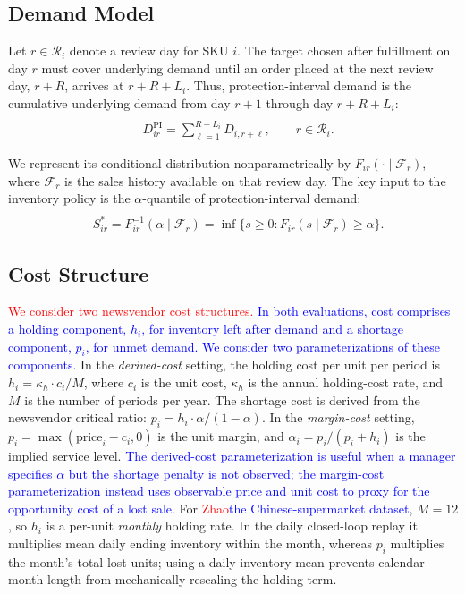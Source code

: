 \documentclass[msom,dblanonrev]{informs4}
\newcommand{\cF}{\mathcal{F}}
\newcommand{\add}[1]{\textcolor{blue}{#1}}
\newcommand{\reduce}[1]{\textcolor{red}{#1}\hspace{0.5em}}
\begin{document}
\subsection{Demand Model}

Let $r\in\mathcal R_i$ denote a review day for SKU $i$. The target chosen after fulfillment on day $r$ must cover underlying demand until an order placed at the next review day, $r+R$, arrives at $r+R+L_i$. Thus, protection-interval demand is the cumulative underlying demand from day $r+1$ through day $r+R+L_i$:
\begin{equation}\label{eq:pi_demand}
  \begin{aligned}
    &\\
    &D_{ir}^{\text{PI}} = \sum_{\ell=1}^{R+L_i} D_{i,r+\ell}, \qquad r\in\mathcal R_i.
  \end{aligned}
\end{equation}


We represent its conditional distribution nonparametrically by $F_{ir}(\cdot \mid \cF_r)$, where $\cF_r$ is the sales history available on that review day.
The key input to the inventory policy is the $\alpha$-quantile of protection-interval demand:
\begin{equation}\label{eq:quantile}
  \begin{aligned}
    &\\
    &S_{ir}^* = F_{ir}^{-1}(\alpha \mid \cF_r) = \inf\{s \geq 0 : F_{ir}(s \mid \cF_r) \geq \alpha\}.
  \end{aligned}
\end{equation}

\subsection{Cost Structure}

\reduce{We consider two newsvendor cost structures.}
\add{In both evaluations, cost comprises a holding component, $h_i$, for inventory left after demand and a shortage component, $p_i$, for unmet demand. We consider two parameterizations of these components.}
In the \emph{derived-cost} setting, the holding cost per unit per period is $h_i = \kappa_h \cdot c_i / M$, where $c_i$ is the unit cost, $\kappa_h$ is the annual holding-cost rate, and $M$ is the number of periods per year.
The shortage cost is derived from the newsvendor critical ratio: $p_i = h_i \cdot \alpha / (1 - \alpha)$.
In the \emph{margin-cost} setting, $p_i = \max(\text{price}_i - c_i, 0)$ is the unit margin, and $\alpha_i = p_i / (p_i + h_i)$ is the implied service level.
\add{The derived-cost parameterization is useful when a manager specifies $\alpha$ but the shortage penalty is not observed; the margin-cost parameterization instead uses observable price and unit cost to proxy for the opportunity cost of a lost sale.}
For \reduce{Zhao}\add{the Chinese-supermarket dataset}, $M=12$, so $h_i$ is a per-unit \emph{monthly} holding rate.
In the daily closed-loop replay it multiplies mean daily ending inventory within the month, whereas $p_i$ multiplies the month's total lost units; using a daily inventory mean prevents calendar-month length from mechanically rescaling the holding term.
\end{document}
